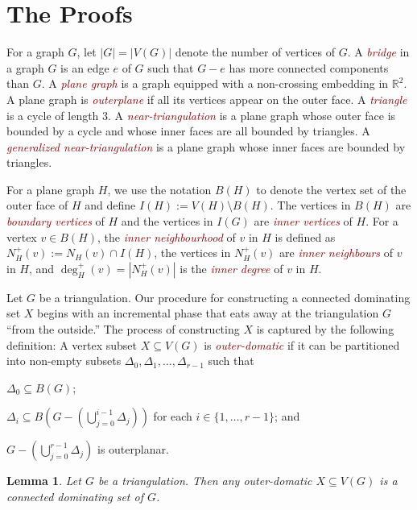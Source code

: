 \documentclass[12pt]{article}
\newtheorem{lem}{Lemma}
\newcommand{\defin}[1]{\emph{\textcolor{Maroon}{#1}}}
\begin{document}
\section{The Proofs}

For a graph $G$, let $|G|=|V(G)|$ denote the number of vertices of $G$.  A \defin{bridge} in a graph $G$ is an edge $e$ of $G$ such that $G-e$ has more connected components than $G$.  A \defin{plane graph} is a graph equipped with a non-crossing embedding in $\mathbb{R}^2$.  A plane graph is \defin{outerplane} if all its vertices appear on the outer face.  A \defin{triangle} is a cycle of length $3$. A \defin{near-triangulation} is a plane graph whose outer face is bounded by a cycle and whose inner faces are all bounded by triangles.  A \defin{generalized near-triangulation} is a plane graph whose inner faces are bounded by triangles.


For a plane graph $H$, we use the notation $B(H)$ to denote the vertex set of the outer face of $H$ and define $I(H):=V(H)\setminus B(H)$.  The vertices in $B(H)$ are \defin{boundary vertices} of $H$ and the vertices in $I(G)$ are \defin{inner vertices} of $H$. For a vertex $v\in B(H)$, the \defin{inner neighbourhood} of $v$ in $H$ is defined as $N_H^+(v):=N_H(v)\cap I(H)$, the vertices in $N^+_H(v)$ are \defin{inner neighbours} of $v$ in $H$, and $\deg^+_H(v)=|N^+_H(v)|$ is the \defin{inner degree} of $v$ in $H$.

Let $G$ be a triangulation.  Our procedure for constructing a connected dominating set $X$ begins with an incremental phase that eats away at the triangulation $G$ ``from the outside.'' The process of constructing $X$ is captured by the following definition:   A vertex subset $X\subseteq V(G)$ is \defin{outer-domatic} if it can be partitioned into non-empty subsets $\Delta_0,\Delta_1,\ldots,\Delta_{r-1}$ such that
\begin{compactenum}[(P1)]
    \item $\Delta_0\subseteq B(G)$; \label{outer_face}
    \item $\Delta_i\subseteq B(G-(\bigcup_{j=0}^{i-1}\Delta_j))$ for each $i\in\{1,\ldots,r-1\}$; and \label{incremental}
    \item $G-(\bigcup_{j=0}^{r-1}\Delta_j)$ is outerplanar. \label{outerplanar}
\end{compactenum}

\begin{lem}\label{outer_domatic}
    Let $G$ be a triangulation.  Then any outer-domatic $X\subseteq V(G)$ is a connected dominating set of $G$.
\end{lem}
\end{document}
